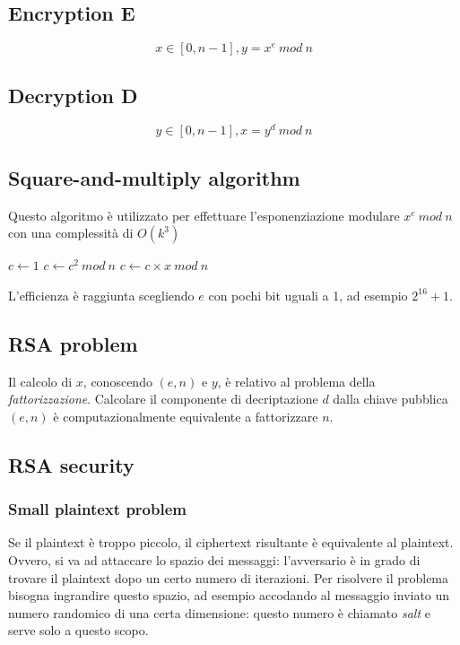 \documentclass[a4paper,12pt]{article}
\begin{document}
\subsection{Encryption E}
$$ x \in [0, n-1], y = x^e\ mod\ n$$

\subsection{Decryption D}
$$ y \in [0, n-1], x = y^d\ mod\ n$$

\subsection{Square-and-multiply algorithm}
Questo algoritmo è utilizzato per effettuare l'esponenziazione modulare $x^e\ mod\ n$ con una complessità di $O(k^3)$

\begin{algorithm}[H]
\begin{algorithmic}
\State $c \gets 1$
	\State $c \gets c^2\ mod\ n$
	 \State $c \gets c \times x\ mod\ n$ \EndIf
\EndFor
\end{algorithmic}
\end{algorithm}
L'efficienza è raggiunta scegliendo $e$ con pochi bit uguali a 1, ad esempio $2^{16} + 1$.

\subsection{RSA problem}
Il calcolo di $x$, conoscendo $(e,n)$ e $y$, è relativo al problema della \textit{fattorizzazione}.
Calcolare il componente di decriptazione $d$ dalla chiave pubblica $(e,n)$ è computazionalmente equivalente a fattorizzare $n$.

\subsection{RSA security}
\subsubsection{Small plaintext problem}
Se il plaintext è troppo piccolo, il ciphertext risultante è equivalente al plaintext. \\
Ovvero, si va ad attaccare lo spazio dei messaggi: l'avversario è in grado di trovare il plaintext dopo un certo numero di iterazioni. 
Per risolvere il problema bisogna ingrandire questo spazio, ad esempio accodando al messaggio inviato un numero randomico di una certa dimensione: questo numero è chiamato \textit{salt} e serve solo a questo scopo.
\end{document}
